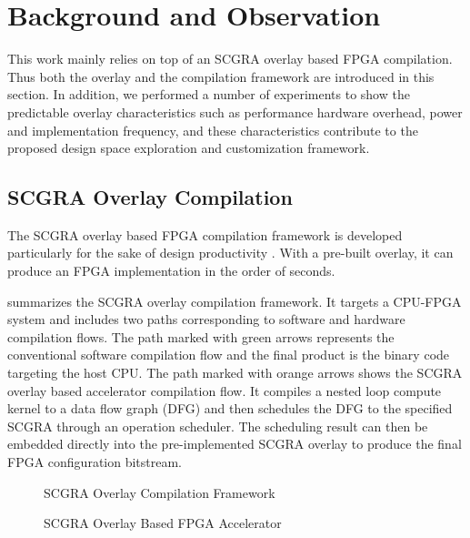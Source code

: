 \section{Background and Observation} \label{sec:background}
This work mainly relies on top of an SCGRA overlay based FPGA 
compilation. Thus both the overlay and the compilation 
framework are introduced in this section. In addition, 
we performed a number of experiments to show the 
predictable overlay characteristics such as performance 
hardware overhead, power and implementation frequency, 
and these characteristics contribute to the proposed design space exploration 
and customization framework. 

\subsection{SCGRA Overlay Compilation}
The SCGRA overlay based FPGA compilation framework 
is developed particularly for the sake of design productivity \cite{scgra}. 
With a pre-built overlay, it can produce an FPGA implementation 
in the order of seconds.

 summarizes the SCGRA overlay 
compilation framework. It targets a CPU-FPGA system and includes 
two paths corresponding to software and hardware compilation flows. 
The path marked with green arrows represents the conventional software 
compilation flow and the final product is the binary code targeting the host CPU. 
The path marked with orange arrows shows the 
SCGRA overlay based accelerator compilation flow. It compiles a 
nested loop compute kernel to a data flow graph (DFG) and then schedules 
the DFG to the specified SCGRA through an operation scheduler. 
The scheduling result can then be embedded directly into the pre-implemented 
SCGRA overlay to produce the final FPGA configuration bitstream.

\begin{figure}[H]
\caption{SCGRA Overlay Compilation Framework}
\label{fig:scgra-compile}
\end{figure}

\begin{figure}[H]
\caption{SCGRA Overlay Based FPGA Accelerator}
\label{fig:scgra-acc}
\end{figure}


